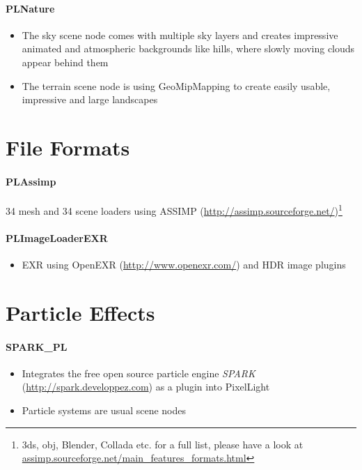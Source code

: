 \paragraph{PLNature}
\begin{itemize}
\item{The sky scene node comes with multiple sky layers and creates impressive animated and atmospheric backgrounds like hills, where slowly moving clouds appear behind them}
\item{The terrain scene node is using GeoMipMapping to create easily usable, impressive and large landscapes}
\end{itemize}




\section{File Formats}


\paragraph{PLAssimp}
34 mesh and 34 scene loaders using \ac{ASSIMP} (\url{http://assimp.sourceforge.net/})\footnote{3ds, obj, Blender, Collada etc. for a full list, please have a look at \url{assimp.sourceforge.net/main_features_formats.html}}


\paragraph{PLImageLoaderEXR}
\begin{itemize}
\item{EXR using OpenEXR (\url{http://www.openexr.com/}) and \ac{HDR} image plugins}
\end{itemize}




\section{Particle Effects}


\paragraph{SPARK\_PL}
\begin{itemize}
\item{Integrates the free open source particle engine \emph{SPARK} (\url{http://spark.developpez.com}) as a plugin into PixelLight}
\item{Particle systems are usual scene nodes}
\end{itemize}


